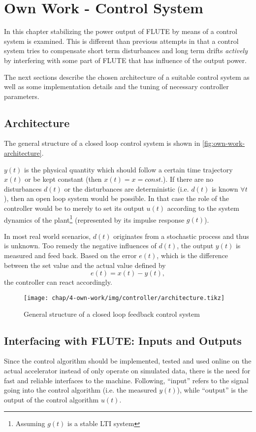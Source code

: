 \chapter{Own Work - Control System}
In this chapter stabilizing the power output of FLUTE by means of a control system is examined. This is different than previous attempts in that a control system tries to compensate short term disturbances and long term drifts \textit{actively} by interfering with some part of FLUTE that has influence of the output power.

The next sections describe the chosen architecture of a suitable control system as well as some implementation details and the tuning of necessary controller parameters.

\section{Architecture}
The general structure of a closed loop control system is shown in \autoref{fig:own-work-architecture}.

$y(t)$ is the physical quantity which should follow a certain time trajectory $x(t)$ or be kept constant (then $x(t)=x=const.$). If there are no disturbances $d(t)$ or the disturbances are deterministic (i.e. $d(t)$ is known $\forall t$), then an open loop system would be possible. In that case the role of the controller would be to merely to set its output $u(t)$ according to the system dynamics of the plant\footnote{Assuming $g(t)$ is a stable LTI system} (represented by its impulse response $g(t)$).

In most real world scenarios, $d(t)$ originates from a stochastic process and thus is unknown. Too remedy the negative influences of $d(t)$, the output $y(t)$ is measured and feed back. Based on the error $e(t)$, which is the difference between the set value and the actual value defined by
\begin{equation}
e(t) = x(t) - y(t),
\end{equation}
the controller can react accordingly.

\begin{figure}[tb]
	\centering
	\texttt{[image: chap/4-own-work/img/controller/architecture.tikz]}
	\caption{General structure of a closed loop feedback control system}
	\label{fig:own-work-architecture}
\end{figure}


\section{Interfacing with FLUTE: Inputs and Outputs}
Since the control algorithm should be implemented, tested and used online on the actual accelerator instead of only operate on simulated data, there is the need for fast and reliable interfaces to the machine.
Following, ``input'' refers to the signal going into the control algorithm (i.e. the measured $y(t)$), while ``output'' is the output of the control algorithm $u(t)$.

